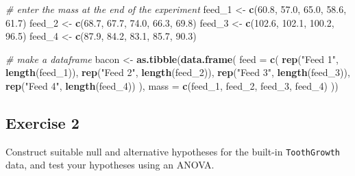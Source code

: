 \documentclass[english,10pt,a4paper,oneside]{book}
\newenvironment{Shaded}{\begin{snugshade}}{\end{snugshade}}
\newcommand{\KeywordTok}[1]{\textcolor[rgb]{0.13,0.29,0.53}{\textbf{#1}}}
\newcommand{\DataTypeTok}[1]{\textcolor[rgb]{0.13,0.29,0.53}{#1}}
\newcommand{\DecValTok}[1]{\textcolor[rgb]{0.00,0.00,0.81}{#1}}
\newcommand{\FloatTok}[1]{\textcolor[rgb]{0.00,0.00,0.81}{#1}}
\newcommand{\StringTok}[1]{\textcolor[rgb]{0.31,0.60,0.02}{#1}}
\newcommand{\CommentTok}[1]{\textcolor[rgb]{0.56,0.35,0.01}{\textit{#1}}}
\newcommand{\NormalTok}[1]{#1}
\theoremstyle{definition}
\theoremstyle{definition}
\theoremstyle{definition}
\theoremstyle{remark}
\begin{document}
\begin{Shaded}
\begin{Highlighting}[]
\CommentTok{# enter the mass at the end of the experiment}
\NormalTok{feed_}\DecValTok{1}\NormalTok{ <-}\StringTok{ }\KeywordTok{c}\NormalTok{(}\FloatTok{60.8}\NormalTok{, }\FloatTok{57.0}\NormalTok{, }\FloatTok{65.0}\NormalTok{, }\FloatTok{58.6}\NormalTok{, }\FloatTok{61.7}\NormalTok{)}
\NormalTok{feed_}\DecValTok{2}\NormalTok{ <-}\StringTok{ }\KeywordTok{c}\NormalTok{(}\FloatTok{68.7}\NormalTok{, }\FloatTok{67.7}\NormalTok{, }\FloatTok{74.0}\NormalTok{, }\FloatTok{66.3}\NormalTok{, }\FloatTok{69.8}\NormalTok{)}
\NormalTok{feed_}\DecValTok{3}\NormalTok{ <-}\StringTok{ }\KeywordTok{c}\NormalTok{(}\FloatTok{102.6}\NormalTok{, }\FloatTok{102.1}\NormalTok{, }\FloatTok{100.2}\NormalTok{, }\FloatTok{96.5}\NormalTok{)}
\NormalTok{feed_}\DecValTok{4}\NormalTok{ <-}\StringTok{ }\KeywordTok{c}\NormalTok{(}\FloatTok{87.9}\NormalTok{, }\FloatTok{84.2}\NormalTok{, }\FloatTok{83.1}\NormalTok{, }\FloatTok{85.7}\NormalTok{, }\FloatTok{90.3}\NormalTok{)}

\CommentTok{# make a dataframe}
\NormalTok{bacon <-}\StringTok{ }\KeywordTok{as.tibble}\NormalTok{(}\KeywordTok{data.frame}\NormalTok{(}
  \DataTypeTok{feed =} \KeywordTok{c}\NormalTok{(}
  \KeywordTok{rep}\NormalTok{(}\StringTok{"Feed 1"}\NormalTok{, }\KeywordTok{length}\NormalTok{(feed_}\DecValTok{1}\NormalTok{)),}
  \KeywordTok{rep}\NormalTok{(}\StringTok{"Feed 2"}\NormalTok{, }\KeywordTok{length}\NormalTok{(feed_}\DecValTok{2}\NormalTok{)),}
  \KeywordTok{rep}\NormalTok{(}\StringTok{"Feed 3"}\NormalTok{, }\KeywordTok{length}\NormalTok{(feed_}\DecValTok{3}\NormalTok{)),}
  \KeywordTok{rep}\NormalTok{(}\StringTok{"Feed 4"}\NormalTok{, }\KeywordTok{length}\NormalTok{(feed_}\DecValTok{4}\NormalTok{))}
\NormalTok{  ),}
  \DataTypeTok{mass =} \KeywordTok{c}\NormalTok{(feed_}\DecValTok{1}\NormalTok{, feed_}\DecValTok{2}\NormalTok{, feed_}\DecValTok{3}\NormalTok{, feed_}\DecValTok{4}\NormalTok{)}
\NormalTok{  ))}
\end{Highlighting}
\end{Shaded}

\subsection{Exercise 2}\label{exercise-2-1}

Construct suitable null and alternative hypotheses for the built-in
\texttt{ToothGrowth} data, and test your hypotheses using an ANOVA.
\end{document}
